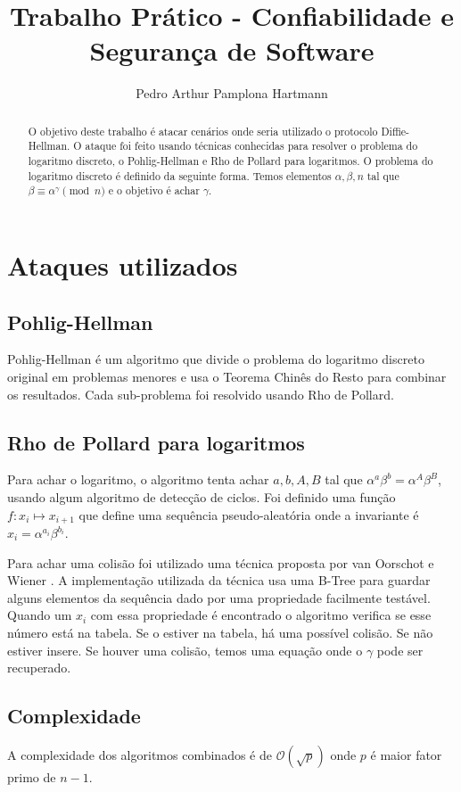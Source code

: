\documentclass{article}
\title{Trabalho Prático - Confiabilidade e Segurança de Software}
\author{Pedro Arthur Pamplona Hartmann}
\date{}
\begin{document}
\maketitle
\begin{abstract}
O objetivo deste trabalho é atacar cenários onde seria utilizado o protocolo Diffie-Hellman.
O ataque foi feito usando técnicas conhecidas para resolver o problema do logaritmo discreto, o Pohlig-Hellman e Rho de Pollard para logaritmos.
O problema do logaritmo discreto é definido da seguinte forma.
Temos elementos $\alpha,\beta,n$ tal que $\beta \equiv \alpha^\gamma \pmod n$ e o objetivo é achar $\gamma$.
\end{abstract}

\section{Ataques utilizados}
\subsection{Pohlig-Hellman}
Pohlig-Hellman é um algoritmo que divide o problema do logaritmo discreto original em problemas menores e usa o Teorema Chinês do Resto para combinar os resultados.
Cada sub-problema foi resolvido usando Rho de Pollard.

\subsection{Rho de Pollard para logaritmos}
Para achar o logaritmo, o algoritmo tenta achar $a,b,A,B$ tal que $\alpha^a\beta^b=\alpha^A\beta^B$, usando algum algoritmo de detecção de ciclos.
Foi definido uma função $f:x_i \mapsto x_{i+1}$ que define uma sequência pseudo-aleatória onde a invariante é $x_i=\alpha^{a_i}\beta^{b_i}$.

Para achar uma colisão foi utilizado uma técnica proposta por van Oorschot e Wiener \cite{oorschot+wiener}.
A implementação utilizada da técnica usa uma B-Tree para guardar alguns elementos da sequência dado por uma propriedade facilmente testável.
Quando um $x_i$ com essa propriedade é encontrado o algoritmo verifica se esse número está na tabela.
Se o estiver na tabela, há uma possível colisão.
Se não estiver insere.
Se houver uma colisão, temos uma equação onde o $\gamma$ pode ser recuperado.

\subsection{Complexidade}
A complexidade dos algoritmos combinados é de $\mathcal{O}(\sqrt p)$ onde $p$ é maior fator primo de $n-1$.
\end{document}
